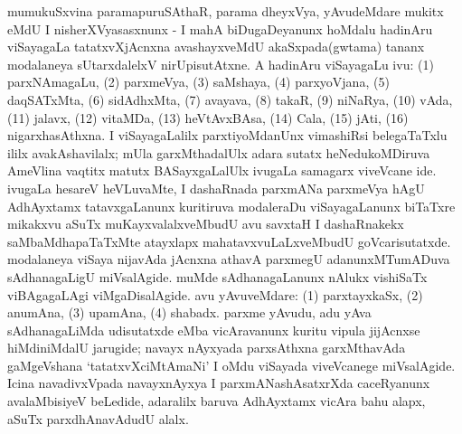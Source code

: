 mumukuSxvina paramapuruSAthaR, parama dheyxVya, yAvudeMdare mukitx eMdU I nisherXVyasasxnunx - I mahA biDugaDeyanunx hoMdalu hadinAru viSayagaLa tatatxvXjAcnxna avashayxveMdU akaSxpada(gwtama) tananx modalaneya sUtarxdalelxV nirUpisutAtxne. A hadinAru viSayagaLu ivu: (1) parxNAmagaLu, (2) parxmeVya, (3) saMshaya, (4) parxyoVjana, (5) daqSATxMta, (6) sidAdhxMta, (7) avayava, (8) takaR, (9) niNaRya, (10) vAda, (11) jalavx, (12) vitaMDa, (13) heVtAvxBAsa, (14) Cala, (15) jAti, (16) nigarxhasAthxna. I viSayagaLalilx parxtiyoMdanUnx vimashiRsi belegaTaTxlu ililx avakAshavilalx; mUla garxMthadalUlx adara sutatx heNedukoMDiruva AmeVlina vaqtitx matutx BASayxgaLalUlx ivugaLa samagarx viveVcane ide. ivugaLa hesareV heVLuvaMte, I dashaRnada parxmANa parxmeVya hAgU AdhAyxtamx tatavxgaLanunx kuritiruva modaleraDu viSayagaLanunx biTaTxre mikakxvu aSuTx muKayxvalalxveMbudU avu savxtaH I dashaRnakekx saMbaMdhapaTaTxMte atayxlapx mahatavxvuLaLxveMbudU goVcarisutatxde. modalaneya viSaya nijavAda jAcnxna athavA parxmegU adanunxMTumADuva sAdhanagaLigU miVsalAgide. muMde sAdhanagaLanunx nAlukx vishiSaTx viBAgagaLAgi viMgaDisalAgide. avu yAvuveMdare: (1) parxtayxkaSx, (2) anumAna, (3) upamAna, (4) shabadx. parxme yAvudu, adu yAva sAdhanagaLiMda udisutatxde eMba vicAravanunx kuritu vipula jijAcnxse hiMdiniMdalU jarugide; navayx nAyxyada parxsAthxna garxMthavAda gaMgeVshana `tatatxvXciMtAmaNi' I oMdu viSayada viveVcanege miVsalAgide. Icina navadivxVpada navayxnAyxya I parxmANashAsatxrXda caceRyanunx avalaMbisiyeV beLedide, adaralilx baruva AdhAyxtamx vicAra bahu alapx, aSuTx parxdhAnavAdudU alalx.

\newpage

